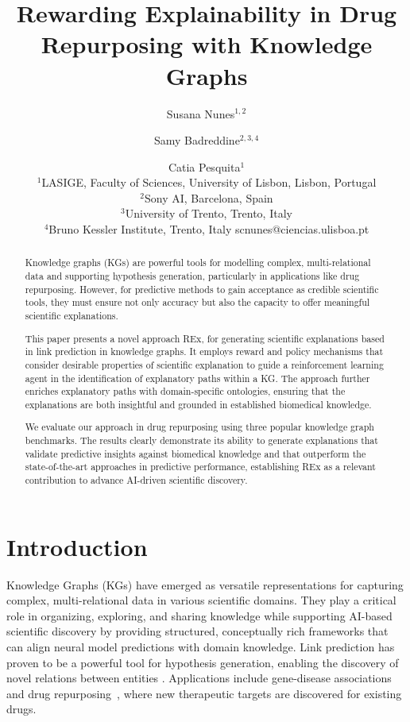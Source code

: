 \documentclass{article}
\title{Rewarding Explainability in Drug Repurposing with Knowledge Graphs}
\author{
Susana Nunes$^{1,2}$
\and
Samy Badreddine$^{2,3,4}$\and
Catia Pesquita$^1$\\
\affiliations
$^1$LASIGE, Faculty of Sciences, University of Lisbon, Lisbon, Portugal\\
$^2$Sony AI, Barcelona, Spain\\
$^3$University of Trento, Trento, Italy\\
$^4$Bruno Kessler Institute, Trento, Italy
\emails
scnunes@ciencias.ulisboa.pt
}
\theoremstyle{definition}
\begin{document}
\maketitle

\begin{abstract}
Knowledge graphs (KGs) are powerful tools for modelling complex, multi-relational data and supporting hypothesis generation, particularly in applications like drug repurposing. However, for predictive methods to gain acceptance as credible scientific tools, they must ensure not only accuracy but also the capacity to offer meaningful scientific explanations.

This paper presents a novel approach REx, for generating scientific explanations based in link prediction in knowledge graphs. It employs reward and policy mechanisms that consider desirable properties of scientific explanation to guide a reinforcement learning agent in the identification of explanatory paths within a KG. The approach further enriches explanatory paths with domain-specific ontologies, ensuring that the explanations are both insightful and grounded in established biomedical knowledge. 

We evaluate our approach in drug repurposing using three popular knowledge graph benchmarks. The results clearly demonstrate its ability to generate explanations that validate predictive insights against biomedical knowledge and that outperform the state-of-the-art approaches in predictive performance, establishing REx as a relevant contribution to advance AI-driven scientific discovery.
\end{abstract}

\section{Introduction}
Knowledge Graphs (KGs) have emerged as versatile representations for capturing complex, multi-relational data in various scientific domains. They play a critical role in organizing, exploring, and sharing knowledge while supporting AI-based scientific discovery by providing structured, conceptually rich frameworks that can align neural model predictions with domain knowledge\cite{d2024role}. Link prediction has proven to be a powerful tool for hypothesis generation, enabling the discovery of novel relations between entities \cite{ott2022linkexplorer,akujuobi2024link}. Applications include gene-disease associations~\cite{yuen2020better} and drug repurposing~\cite{napolitano2018gene2drug}, where new therapeutic targets are discovered for existing drugs. 
\end{document}
